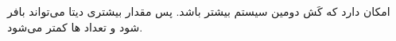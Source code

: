 ~\\\\
امکان دارد که کَش
دومین سیستم بیشتر باشد. پس مقدار بیشتری دیتا می‌تواند بافر شود و تعداد
ها
کمتر می‌شود.